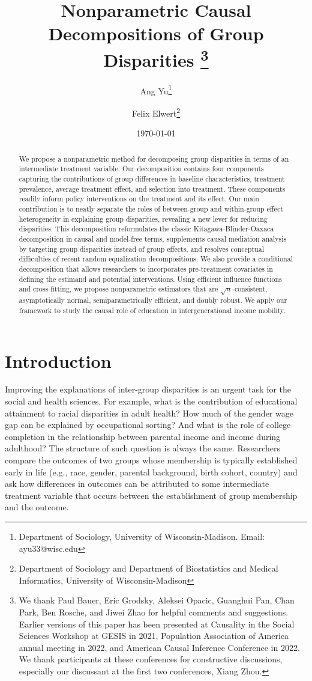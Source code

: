 \documentclass[12pt,a4paper]{article}
\title{\Large Nonparametric Causal Decompositions of Group Disparities \thanks{We thank Paul Bauer, Eric Grodsky, Aleksei Opacic, Guanghui Pan, Chan Park, Ben Rosche, and Jiwei Zhao for helpful comments and suggestions. Earlier versions of this paper has been presented at Causality in the Social Sciences Workshop at GESIS in 2021, Population Association of America annual meeting in 2022, and American Causal Inference Conference in 2022. We thank participants at these conferences for constructive discussions, especially our discussant at the first two conferences, Xiang Zhou.}}
\author{\large Ang Yu\thanks{Department of Sociology, University of Wisconsin-Madison. Email: ayu33@wisc.edu} \and Felix Elwert\thanks{Department of Sociology and Department of Biostatistics and Medical Informatics, University of Wisconsin-Madison}}
\date{\large \today}
\begin{document}
\maketitle

\begin{abstract}
We propose a nonparametric method for decomposing group disparities in terms of an intermediate treatment variable. Our decomposition contains four components capturing the contributions of group differences in baseline characteristics, treatment prevalence, average treatment effect, and selection into treatment. These components readily inform policy interventions on the treatment and its effect. Our main contribution is to neatly separate the roles of between-group and within-group effect heterogeneity in explaining group disparities, revealing a new lever for reducing disparities. This decomposition reformulates the classic Kitagawa-Blinder-Oaxaca decomposition in causal and model-free terms, supplements causal mediation analysis by targeting group disparities instead of group effects, and resolves conceptual difficulties of recent random equalization decompositions. We also provide a conditional decomposition that allows researchers to incorporates pre-treatment covariates in defining the estimand and potential interventions. Using efficient influence functions and cross-fitting, we propose nonparametric estimators that are $\sqrt{n}$-consistent, asymptotically normal, semiparametrically efficient, and doubly robust. We apply our framework to study the causal role of education in intergenerational income mobility. 
\end{abstract}

\section{Introduction}

Improving the explanations of inter-group disparities is an urgent task for the social and health sciences. For example, what is the contribution of educational attainment to racial disparities in adult health? How much of the gender wage gap can be explained by occupational sorting? And what is the role of college completion in the relationship between parental income and income during adulthood? 
The structure of such question is always the same. Researchers compare the outcomes of two groups whose membership is typically established early in life (e.g., race, gender, parental background, birth cohort, country) and ask how differences in outcomes can be attributed to some intermediate treatment variable that occurs between the establishment of group membership and the outcome. 
\end{document}
